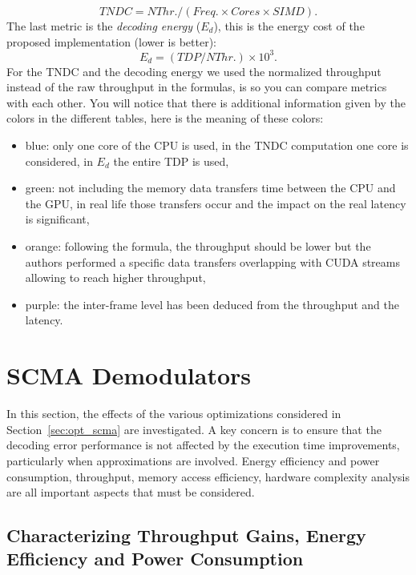 \begin{equation}
  TNDC = NThr. / (Freq. \times Cores \times SIMD).
\end{equation}
The last metric is the \emph{decoding energy} ($E_d$), this is the energy cost
of the proposed implementation (lower is better):
\begin{equation}
  E_d = (TDP / NThr.) \times 10^3.
\end{equation}
For the TNDC and the decoding energy we used the normalized throughput instead
of the raw throughput in the formulas, is so you can compare metrics with each
other. You will notice that there is additional information given by the colors
in the different tables, here is the meaning of these colors:
\begin{itemize}
  \item {\color{Paired-1}blue}: only one core of the CPU is used, in the TNDC
    computation one core is considered, in $E_d$ the entire TDP is used,
  \item {\color{Paired-3}green}: not including the memory data transfers time
    between the CPU and the GPU, in real life those transfers occur and the
    impact on the real latency is significant,
  \item {\color{Paired-7}orange}: following the formula, the throughput should
    be lower but the authors performed a specific data transfers overlapping
    with CUDA streams allowing to reach higher throughput,
  \item {\color{Paired-9}purple}: the inter-frame level has been deduced from
    the throughput and the latency.
\end{itemize}

\section{SCMA Demodulators}
\label{sec:eval_scma}

In this section, the effects of the various optimizations considered in
Section~\ref{sec:opt_scma} are investigated. A key concern is to ensure that the
decoding error performance is not affected by the execution time improvements,
particularly when approximations are involved. Energy efficiency and power
consumption, throughput, memory access efficiency, hardware complexity analysis
are all important aspects that must be considered.

\subsection{Characterizing Throughput Gains, Energy Efficiency and Power Consumption}
\label{sec:eval_scma_throughput}

